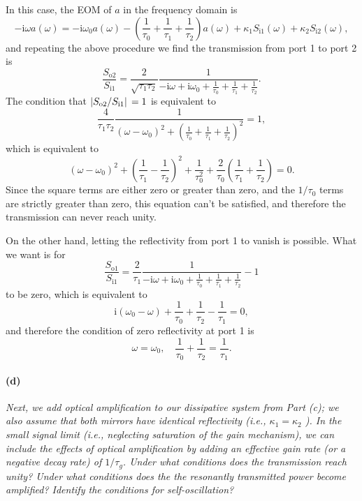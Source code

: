 \documentclass[hyperref, a4paper]{article}
\newcommand*{\ii}{\mathrm{i}}
\newcommand*{\Si}[1]{S_{\text{i#1}}}
\newcommand*{\So}[1]{S_{\text{o#1}}}
\begin{document}
In this case, the EOM of $a$ in the frequency domain is
\begin{equation}
    - \ii \omega a(\omega) = - \ii \omega_0 a(\omega) - \left(\frac{1}{\tau_0} + \frac{1}{\tau_1} + \frac{1}{\tau_2}\right) a(\omega) + 
    \kappa_1 \Si{1}(\omega) + \kappa_2 \Si{2}(\omega),
\end{equation}
and repeating the above procedure we find the transmission from port 1 to port 2 is 
\begin{equation}
    \frac{\So{2}}{\Si{1}} = \frac{2}{\sqrt{\tau_1 \tau_2}} \frac{1}{- \ii \omega + \ii \omega_0 + \frac{1}{\tau_0} + \frac{1}{\tau_1} + \frac{1}{\tau_2}}.
\end{equation}
The condition that $\abs*{\So{2} / \Si{1}} = 1$ is equivalent to 
\[
    \frac{4}{\tau_1 \tau_2} \frac{1}{(\omega - \omega_0)^2 + \left( \frac{1}{\tau_0} + \frac{1}{\tau_1} + \frac{1}{\tau_2} \right)^2} = 1,
\]
which is equivalent to 
\begin{equation}
    (\omega - \omega_0)^2 + \left( \frac{1}{\tau_1} - \frac{1}{\tau_2} \right)^2 
    + \frac{1}{\tau_0^2} + \frac{2}{\tau_0} \left( \frac{1}{\tau_1} + \frac{1}{\tau_2} \right) = 0.
\end{equation}
Since the square terms are either zero or greater than zero,
and the $1/\tau_0$ terms are strictly greater than zero, 
this equation can't be satisfied, 
and therefore the transmission can never reach unity.

On the other hand, letting the reflectivity from port 1 to vanish is possible.
What we want is for
\begin{equation}
    \frac{\So{1}}{\Si{1}} = \frac{2}{\tau_1} \frac{1}{- \ii \omega + \ii \omega_0 + \frac{1}{\tau_0} + \frac{1}{\tau_1} + \frac{1}{\tau_2}} - 1
\end{equation}
to be zero, which is equivalent to 
\[
    \ii (\omega_0 - \omega) + \frac{1}{\tau_0} + \frac{1}{\tau_2} - \frac{1}{\tau_1} = 0,
\] 
and therefore the condition of zero reflectivity at port 1 is 
\begin{equation}
    \omega = \omega_0, \quad \frac{1}{\tau_0} + \frac{1}{\tau_2} = \frac{1}{\tau_1}.
\end{equation}

\paragraph*{(d)} \textit{Next, we add optical amplification to our dissipative system from Part (c); we also assume that both mirrors have identical reflectivity (i.e., $\kappa_1=\kappa_2$ ). In the small signal limit (i.e., neglecting saturation of the gain mechanism), we can include the effects of optical amplification by adding an effective gain rate (or a negative decay rate) of $1 / \tau_g$. Under what conditions does the transmission reach unity? Under what conditions does the the resonantly transmitted power become amplified? Identify the conditions for self-oscillation?} 
\end{document}
